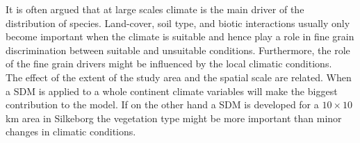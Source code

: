 It is often argued that at large scales climate is the main driver of the distribution of species. Land-cover, soil type, and biotic interactions usually only become important when the climate is suitable and hence play a role in fine grain discrimination between suitable and unsuitable conditions. Furthermore, the role of the fine grain drivers might be influenced by the local climatic conditions. \\

The effect of the extent of the study area and the spatial scale are related. When a SDM is applied to a whole continent climate variables will make the biggest contribution to the model. If on the other hand a SDM is developed for a $10\times 10$ km area in Silkeborg the vegetation type might be more important than minor changes in climatic conditions.



